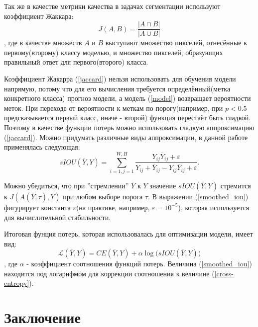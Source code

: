 \documentclass[14pt, a4paper, oneside, bold]{extarticle}
\begin{document}
Так же в качестве метрики качества в задачах сегментации используют коэффициент Жаккара: 
\begin{equation} \label{jaccard}
	J(A, B) = \frac{|A \cap B|}{|A \cup B|} 
\end{equation}
, где в качестве множеств $A$ и $B$ выступают множество пикселей, отнесённые к 
первому(второму) классу моделью, и множество пикселей, образующих правильный ответ для первого(второго) класса.

Коэффициент Жакарра (\ref{jaccard}) нельзя использовать для обучения модели напрямую, потому что для его вычисления требуется определённый(метка конкретного класса) прогноз модели, а модель 
(\ref{model}) возвращает вероятности меток. При переходе от вероятности к меткам по порогу(например, при $p<0.5$ предсказывается первый класс, иначе - второй) функция перестаёт быть гладкой. Поэтому в качестве функции потерь можно использовать гладкую аппроксимацию (\ref{jaccard}). Можно придумать различные виды аппроксимации, в данной работе применялась следующая:
\begin{equation} \label{smoothed_iou}
	sIOU(\overline{Y}, Y) = \sum \limits_{i=1, j=1}^{W, H}
		\frac{Y_{ij} \overline{Y}_{ij} + \varepsilon}
		{Y_{ij} + \overline{Y}_{ij} 
			- Y_{ij} \overline{Y}_{ij} + \varepsilon}.
\end{equation} 
 
Можно убедиться, что при ''стремлении'' 
$\overline{Y}$ к $Y$ значение $sIOU(\overline{Y}, Y)$ стремится к $J(A(\overline{Y}, \tau), Y)$ при любом выборе порога $\tau$. В выражении (\ref{smoothed_iou}) фигурирует 
константа $\varepsilon$(на практике, например, $\varepsilon=10^{-5}$), которая используется для вычислительной стабильности.
 
Итоговая фунция потерь, которая использовалась для оптимизации модели, имеет вид:
\begin{equation} \label{final_loss}
	\mathcal{L}(\overline{Y}, Y) = CE(\overline{Y}, Y)
		+ \alpha \log \bigl( sIOU(\overline{Y}, Y) \bigr)
\end{equation}
, где $\alpha$ - коэффициент соотношения функций потерь. Величина (\ref{smoothed_iou}) находится под логарифмом для коррекции соотношения к величине (\ref{cross-entropy}).

\newpage


\section{Заключение}
\end{document}
